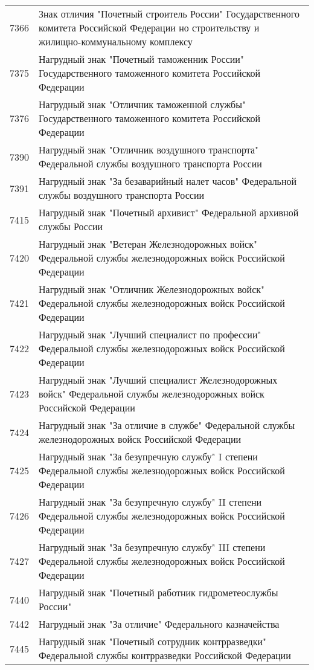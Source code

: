 \documentclass[10pt, a4paper, titlepage]{article}
\begin{document}
\begin{center}
\begin{longtable}{rp{}}
        7366 & Знак отличия "Почетный строитель России" Государственного комитета Российской Федерации но строительству и жилищно-коммунальному комплексу \\
        7375 & Нагрудный знак "Почетный таможенник России" Государственного таможенного комитета Российской Федерации \\
        7376 & Нагрудный знак "Отличник таможенной службы" Государственного таможенного комитета Российской Федерации \\
        7390 & Нагрудный знак "Отличник воздушного транспорта" Федеральной службы воздушного транспорта России \\
        7391 & Нагрудный знак "За безаварийный налет часов" Федеральной службы воздушного транспорта России \\
        7415 & Нагрудный знак "Почетный архивист" Федеральной архивной службы России \\
        7420 & Нагрудный знак "Ветеран Железнодорожных войск" Федеральной службы железнодорожных войск Российской Федерации \\
        7421 & Нагрудный знак "Отличник Железнодорожных войск" Федеральной службы железнодорожных войск Российской Федерации \\
        7422 & Нагрудный знак "Лучший специалист по профессии" Федеральной службы железнодорожных войск Российской Федерации \\
        7423 & Нагрудный знак "Лучший специалист Железнодорожных войск" Федеральной службы железнодорожных войск Российской Федерации \\
        7424 & Нагрудный знак "За отличие в службе" Федеральной службы железнодорожных войск Российской Федерации \\
        7425 & Нагрудный знак "За безупречную службу" I степени Федеральной службы железнодорожных войск Российской Федерации \\
        7426 & Нагрудный знак "За безупречную службу" II степени Федеральной службы железнодорожных войск Российской Федерации \\
        7427 & Нагрудный знак "За безупречную службу" III степени Федеральной службы железнодорожных войск Российской Федерации \\
        7440 & Нагрудный знак "Почетный работник гидрометеослужбы России" \\
        7442 & Нагрудный знак "За отличие" Федерального казначейства \\
        7445 & Нагрудный знак "Почетный сотрудник контрразведки" Федеральной службы контрразведки Российской Федерации \\

\end{longtable}
\end{center}
\end{document}
